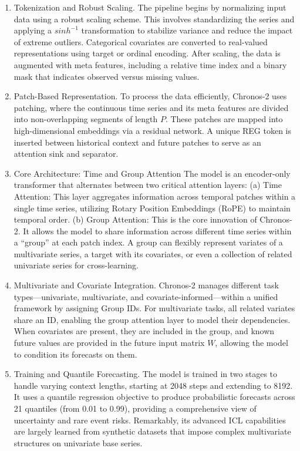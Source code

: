 \documentclass[twocolumn]{article}
\begin{document}
\begin{enumerate}

\item Tokenization and Robust Scaling. 
The pipeline begins by normalizing input data using a robust scaling scheme. This involves standardizing the series and applying a $sinh^{-1}$ transformation to stabilize variance and reduce the impact of extreme outliers. Categorical covariates are converted to real-valued representations using target or ordinal encoding. After scaling, the data is augmented with meta features, including a relative time index and a binary mask that indicates observed versus missing values.

\item Patch-Based Representation. 
To process the data efficiently, Chronos-2 uses patching, where the continuous time series and its meta features are divided into non-overlapping segments of length $P$. These patches are mapped into high-dimensional embeddings via a residual network. A unique REG token is inserted between historical context and future patches to serve as an attention sink and separator.

\item Core Architecture: Time and Group Attention
The model is an encoder-only transformer that alternates between two critical attention layers: (a) Time Attention: This layer aggregates information across temporal patches within a single time series, utilizing Rotary Position Embeddings (RoPE) to maintain temporal order. (b) Group Attention: This is the core innovation of Chronos-2. It allows the model to share information across different time series within a ``group'' at each patch index. A group can flexibly represent variates of a multivariate series, a target with its covariates, or even a collection of related univariate series for cross-learning.

\item Multivariate and Covariate Integration. 
Chronos-2 manages different task types---univariate, multivariate, and covariate-informed---within a unified framework by assigning Group IDs. For multivariate tasks, all related variates share an ID, enabling the group attention layer to model their dependencies. When covariates are present, they are included in the group, and known future values are provided in the future input matrix $W$, allowing the model to condition its forecasts on them.

\item Training and Quantile Forecasting.
The model is trained in two stages to handle varying context lengths, starting at 2048 steps and extending to 8192. It uses a quantile regression objective to produce probabilistic forecasts across 21 quantiles (from 0.01 to 0.99), providing a comprehensive view of uncertainty and rare event risks. Remarkably, its advanced ICL capabilities are largely learned from synthetic datasets that impose complex multivariate structures on univariate base series.

\end{enumerate}
\end{document}
